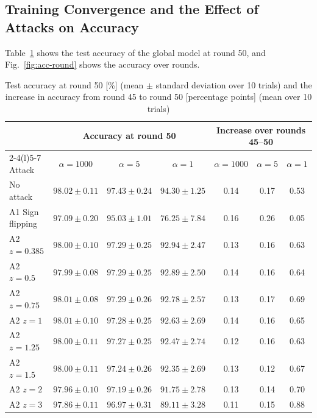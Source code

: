 \documentclass[a4paper,10pt]{article}
\begin{document}
\subsection{Training Convergence and the Effect of Attacks on Accuracy}
\label{sec:res-acc}

Table~\ref{tab:acc} shows the test accuracy of the global model at round 50, and Fig.~\ref{fig:acc-round} shows the accuracy over rounds.

\begin{table}[t]
\centering
\caption{Test accuracy at round 50 [\%] (mean $\pm$ standard deviation over 10 trials) and the increase in accuracy from round 45 to round 50 [percentage points] (mean over 10 trials)}
\label{tab:acc}
\small
\begin{tabular}{@{}lcccccc@{}}
\toprule
 & \multicolumn{3}{c}{Accuracy at round 50} & \multicolumn{3}{c}{Increase over rounds 45--50} \\
\cmidrule(lr){2-4}\cmidrule(l){5-7}
Attack & $\alpha=1000$ & $\alpha=5$ & $\alpha=1$ & $\alpha=1000$ & $\alpha=5$ & $\alpha=1$ \\
\midrule
No attack & $98.02 \pm 0.11$ & $97.43 \pm 0.24$ & $94.30 \pm 1.25$ & 0.14 & 0.17 & 0.53 \\
A1 Sign flipping & $97.09 \pm 0.20$ & $95.03 \pm 1.01$ & $76.25 \pm 7.84$ & 0.16 & 0.26 & 0.05 \\
\midrule
A2 $z{=}0.385$ & $98.00 \pm 0.10$ & $97.29 \pm 0.25$ & $92.94 \pm 2.47$ & 0.13 & 0.16 & 0.63 \\
A2 $z{=}0.5$ & $97.99 \pm 0.08$ & $97.29 \pm 0.25$ & $92.89 \pm 2.50$ & 0.14 & 0.16 & 0.64 \\
A2 $z{=}0.75$ & $98.01 \pm 0.08$ & $97.29 \pm 0.26$ & $92.78 \pm 2.57$ & 0.13 & 0.17 & 0.69 \\
A2 $z{=}1$ & $98.01 \pm 0.10$ & $97.28 \pm 0.25$ & $92.63 \pm 2.69$ & 0.14 & 0.16 & 0.65 \\
A2 $z{=}1.25$ & $98.00 \pm 0.11$ & $97.27 \pm 0.25$ & $92.47 \pm 2.74$ & 0.12 & 0.16 & 0.63 \\
A2 $z{=}1.5$ & $98.00 \pm 0.11$ & $97.24 \pm 0.26$ & $92.35 \pm 2.69$ & 0.13 & 0.12 & 0.67 \\
A2 $z{=}2$ & $97.96 \pm 0.10$ & $97.19 \pm 0.26$ & $91.75 \pm 2.78$ & 0.13 & 0.14 & 0.70 \\
A2 $z{=}3$ & $97.86 \pm 0.11$ & $96.97 \pm 0.31$ & $89.11 \pm 3.28$ & 0.11 & 0.15 & 0.88 \\
\bottomrule
\end{tabular}
\end{table}
\end{document}

